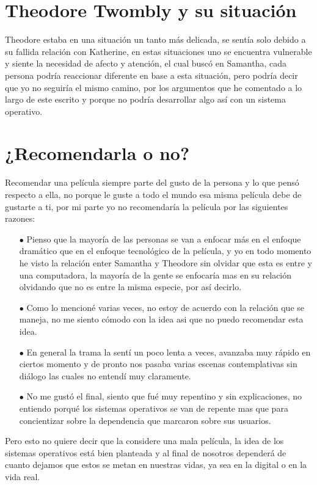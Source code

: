 \documentclass[paper=a4, fontsize=12pt]{scrartcl} %
\begin{document}

\section{Theodore Twombly y su situación}

Theodore estaba en una situación un tanto más delicada, se sentía solo debido a su fallida relación con Katherine, en estas situaciones uno se encuentra vulnerable y siente la necesidad de afecto y atención, el cual buscó en Samantha, cada persona podría reaccionar diferente en base a esta situación, pero podría decir que yo no seguiría el mismo camino, por los argumentos que he comentado a lo largo de este escrito y porque no podría desarrollar algo así con un sistema operativo.


\section{¿Recomendarla o no?}

Recomendar una película siempre parte del gusto de la persona y lo que pensó respecto a ella, no porque le guste a todo el mundo esa misma película debe de gustarte a ti, por mi parte yo no recomendaría la película por las siguientes razones:

\begin{itemize}
	\item[$\bullet$] Pienso que la mayoría de las personas se van a enfocar más en el enfoque dramático que en el enfoque tecnológico de la película, y yo en todo momento he visto la relación enter Samantha y Theodore sin olvidar que esta es entre y una computadora, la mayoría de la gente se enfocaría mas en su relación olvidando que no es entre la misma especie, por así decirlo.
	
	\item[$\bullet$]  Como lo mencioné varias veces, no estoy de acuerdo con la relación que se maneja, no me siento cómodo con la idea asi que no puedo recomendar esta idea.
	
	\item[$\bullet$] En general la trama la sentí un poco lenta a veces, avanzaba muy rápido en ciertos momento y de pronto nos pasaba varias escenas contemplativas sin diálogo las cuales no entendí muy claramente.
	
	\item[$\bullet$] No me gustó el final, siento que fué muy repentino y sin explicaciones, no entiendo porqué los sistemas operativos se van de repente mas que para concientizar sobre la dependencia que marcaron sobre sus usuarios.
\end{itemize}

Pero esto no quiere decir que la considere una mala película, la idea de los sistemas operativos está bien planteada y al final de nosotros dependerá de cuanto dejamos que estos se metan en nuestras vidas, ya sea en la digital o en la vida real.

\end{document}
